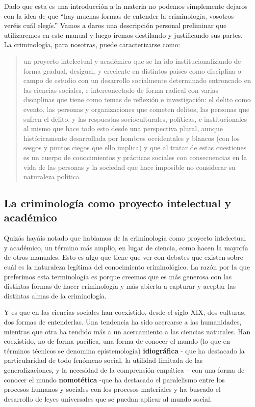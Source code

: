 \documentclass[
  spanish,
  letterpaper,
  DIV=11,
  numbers=noendperiod]{scrreprt}
\begin{document}
Dado que esta es una introducción a la materia no podemos simplemente
dejaros con la idea de que ``hay muchas formas de entender la
criminología, vosotros veréis cuál elegís.'' Vamos a daros una
descripción personal preliminar que utilizaremos en este manual y luego
iremos destilando y justificando sus partes. La criminología, para
nosotras, puede caracterizarse como:

\begin{quote}
un proyecto intelectual y académico que se ha ido institucionalizando de
forma gradual, desigual, y creciente en distintos países como disciplina
o campo de estudio con un desarrollo socialmente determinado entroncado
en las ciencias sociales, e interconectado de forma radical con varias
disciplinas que tiene como temas de reflexión e investigación: el delito
como evento, las personas y organizaciones que cometen delitos, las
personas que sufren el delito, y las respuestas socioculturales,
políticas, e institucionales al mismo que hace todo esto desde una
perspectiva plural, aunque históricamente desarrollada por hombres
occidentales y blancos (con los sesgos y puntos ciegos que ello implica)
y que al tratar de estas cuestiones es un cuerpo de conocimientos y
prácticas sociales con consecuencias en la vida de las personas y la
sociedad que hace imposible no considerar su naturaleza política
\end{quote}

\subsection{La criminología como proyecto intelectual y
académico}\label{la-criminologuxeda-como-proyecto-intelectual-y-acaduxe9mico}

Quizás hayáis notado que hablamos de la criminología como proyecto
intelectual y académico, un término más amplio, en lugar de ciencia,
como hacen la mayoría de otros manuales. Esto es algo que tiene que ver
con debates que existen sobre cuál es la naturaleza legítima del
conocimiento criminológico. La razón por la que preferimos esta
terminología es porque creemos que es más generosa con las distintas
formas de hacer criminología y más abierta a capturar y aceptar las
distintas almas de la criminología.

Y es que en las ciencias sociales han coexistido, desde el siglo XIX,
dos culturas, dos formas de entenderlas. Una tendencia ha sido acercarse
a las humanidades, mientras que otra ha tendido más a un acercamiento a
las ciencias naturales. Han coexistido, no de forma pacífica, una forma
de conocer el mundo (lo que en términos técnicos se denomina
epistemología) \textbf{idiográfica} - que ha destacado la particularidad
de todo fenómeno social, la utilidad limitada de las generalizaciones, y
la necesidad de la comprensión empática -- con una forma de conocer el
mundo \textbf{nomotética} -que ha destacado el paralelismo entre los
procesos humanos y sociales con los procesos materiales y ha buscado el
desarrollo de leyes universales que se puedan aplicar al mundo social.
\end{document}
